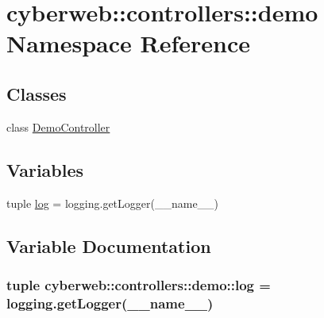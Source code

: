 \hypertarget{namespacecyberweb_1_1controllers_1_1demo}{\section{cyberweb\-:\-:controllers\-:\-:demo \-Namespace \-Reference}
\label{namespacecyberweb_1_1controllers_1_1demo}
}
\subsection*{\-Classes}
\begin{DoxyCompactItemize}
\item 
class \hyperlink{classcyberweb_1_1controllers_1_1demo_1_1_demo_controller}{\-Demo\-Controller}
\end{DoxyCompactItemize}
\subsection*{\-Variables}
\begin{DoxyCompactItemize}
\item 
tuple \hyperlink{namespacecyberweb_1_1controllers_1_1demo_a597f62048e6673b761e3de7359681786}{log} = logging.\-get\-Logger(\-\_\-\-\_\-name\-\_\-\-\_\-)
\end{DoxyCompactItemize}


\subsection{\-Variable \-Documentation}
\hypertarget{namespacecyberweb_1_1controllers_1_1demo_a597f62048e6673b761e3de7359681786}{
\subsubsection[{log}]{\setlength{\rightskip}{0pt plus 5cm}tuple {\bf cyberweb\-::controllers\-::demo\-::log} = logging.\-get\-Logger(\-\_\-\-\_\-name\-\_\-\-\_\-)}}\label{namespacecyberweb_1_1controllers_1_1demo_a597f62048e6673b761e3de7359681786}
